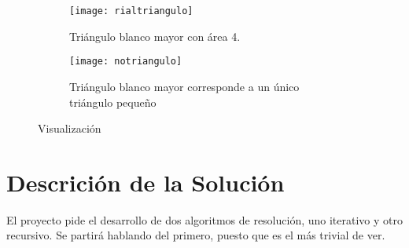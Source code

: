 \documentclass[letterpaper]{article}
\begin{document}
    \begin{figure}
      \centering
      \begin{subfigure}{0.45\textwidth}
        \texttt{[image: rialtriangulo]}
        \caption{Tri\'angulo blanco mayor con \'area 4.}
        \label{subfig:A}
      \end{subfigure}
      \begin{subfigure}{0.45\textwidth}
        \texttt{[image: notriangulo]}
        \caption{Tri\'angulo blanco mayor corresponde a un \'unico tri\'angulo peque\~no}
        \label{subfig:B}
      \end{subfigure}
      \caption{Visualizaci\'on}
    \end{figure}

  \newpage
  \section{Descrici\'on de la Soluci\'on}
  El proyecto pide el desarrollo de dos algoritmos de resoluci\'on, uno iterativo
  y otro recursivo. Se partir\'a hablando del primero, puesto que es el m\'as trivial
  de ver.
\end{document}

